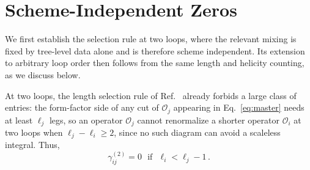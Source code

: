 \section{Scheme-Independent Zeros\label{sec:2loopSI}}

We first establish the selection rule at two loops, where the relevant mixing is fixed by tree-level
data alone and is therefore scheme independent.
Its extension to arbitrary loop order then follows from the same length and helicity counting, as we
discuss below.

At two loops, the length selection rule of Ref.~\cite{Bern:2019wie} already forbids a large class of entries: the form-factor side of any cut of $\mathcal O_j$ appearing in Eq.~\eqref{eq:master} needs at least $\ell_j$ legs, so an operator $\mathcal O_j$ cannot renormalize a shorter operator $\mathcal O_i$ at two loops when $\ell_j - \ell_i \ge 2$, since no such diagram can avoid a scaleless integral. Thus,
\begin{equation}
    \gamma^{(2)}_{ij} = 0 \ \ \ \text{if} \ \ \ \ell_i < \ell_j - 1\,.
\end{equation}

